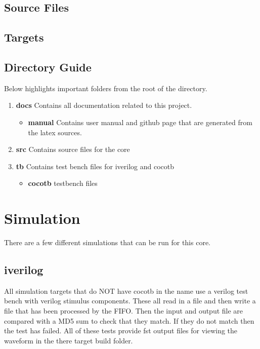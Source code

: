 \subsection{Source Files}



\subsection{Targets}



\subsection{Directory Guide}

\par
Below highlights important folders from the root of the directory.

\begin{enumerate}
  \item \textbf{docs} Contains all documentation related to this project.
    \begin{itemize}
      \item \textbf{manual} Contains user manual and github page that are generated from the latex sources.
    \end{itemize}
  \item \textbf{src} Contains source files for the core
  \item \textbf{tb} Contains test bench files for iverilog and cocotb
    \begin{itemize}
      \item \textbf{cocotb} testbench files
    \end{itemize}
\end{enumerate}

\newpage

\section{Simulation}
\par
There are a few different simulations that can be run for this core.

\subsection{iverilog}
\par
All simulation targets that do NOT have cocotb in the name use a verilog test bench with verilog stimulus components. These all read in a file
and then write a file that has been processed by the FIFO. Then the input and output file are compared with a MD5 sum to check that they
match. If they do not match then the test has failed. All of these tests provide fst output files for viewing the waveform in the there
target build folder.

